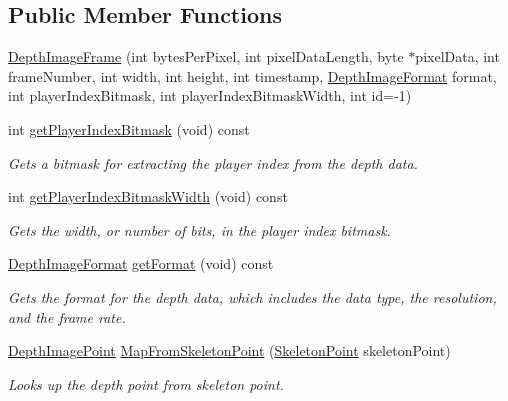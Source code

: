 \subsection*{\-Public \-Member \-Functions}
\begin{DoxyCompactItemize}
\item 
\hyperlink{class_depth_image_frame_aa27dfb16b9401098aaee2c275536e95b}{\-Depth\-Image\-Frame} (int bytes\-Per\-Pixel, int pixel\-Data\-Length, byte $\ast$pixel\-Data, int frame\-Number, int width, int height, int timestamp, \hyperlink{depth_image_format_8h_a00bd0eac7784357ebca4c1e6a50b51af}{\-Depth\-Image\-Format} format, int player\-Index\-Bitmask, int player\-Index\-Bitmask\-Width, int id=-\/1)
\item 
int \hyperlink{class_depth_image_frame_af7db8c69e8d08b62b8a7549a5dbf4e50}{get\-Player\-Index\-Bitmask} (void) const 
\begin{DoxyCompactList}\small\item\em \-Gets a bitmask for extracting the player index from the depth data. \end{DoxyCompactList}\item 
int \hyperlink{class_depth_image_frame_a0fe301e09e741b7a64b4563e2a7cec68}{get\-Player\-Index\-Bitmask\-Width} (void) const 
\begin{DoxyCompactList}\small\item\em \-Gets the width, or number of bits, in the player index bitmask. \end{DoxyCompactList}\item 
\hyperlink{depth_image_format_8h_a00bd0eac7784357ebca4c1e6a50b51af}{\-Depth\-Image\-Format} \hyperlink{class_depth_image_frame_a313e3b5b1eeb6a6b6aa829e081b8cde6}{get\-Format} (void) const 
\begin{DoxyCompactList}\small\item\em \-Gets the format for the depth data, which includes the data type, the resolution, and the frame rate. \end{DoxyCompactList}\item 
\hyperlink{class_depth_image_point}{\-Depth\-Image\-Point} \hyperlink{class_depth_image_frame_a11f56bc4dcbd12226b48b4c60fb8e79a}{\-Map\-From\-Skeleton\-Point} (\hyperlink{class_skeleton_point}{\-Skeleton\-Point} skeleton\-Point)
\begin{DoxyCompactList}\small\item\em \-Looks up the depth point from skeleton point. \end{DoxyCompactList}\item 

\end{DoxyCompactItemize}
